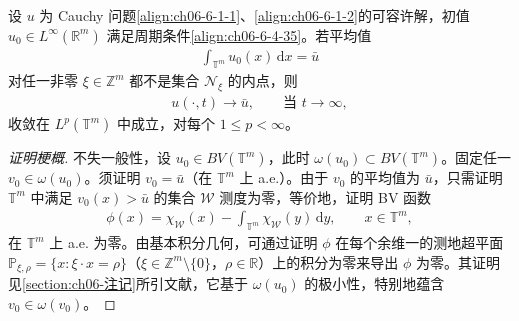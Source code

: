 \documentclass[../../main.tex]{subfiles}
\begin{document}
\begin{theorem}\label{theorem:ch06-6-4-9}
设 $u$ 为 Cauchy 问题\eqref{align:ch06-6-1-1}、\eqref{align:ch06-6-1-2}的可容许解，初值 $u_{0}\in L^{\infty}(\mathbb{R}^{m})$ 满足周期条件\eqref{align:ch06-6-4-35}。若平均值
\begin{align}
\int_{\mathbb{T}^{m}}u_{0}(x)\,\mathrm{d}x=\bar{u}
\label{align:ch06-6-4-39}
\end{align}
对任一非零 $\xi\in\mathbb{Z}^{m}$ 都不是集合 $\mathscr{N}_{\xi}$ 的内点，则
\begin{align}
u(\cdot,t)\to\bar{u},\qquad\text{当 }t\to\infty,
\label{align:ch06-6-4-40}
\end{align}
收敛在 $L^{p}(\mathbb{T}^{m})$ 中成立，对每个 $1\leqslant p<\infty$。
\end{theorem}

\begin{proof}[证明梗概]
不失一般性，设 $u_{0}\in BV(\mathbb{T}^{m})$，此时 $\omega(u_{0})\subset BV(\mathbb{T}^{m})$。固定任一 $v_{0}\in\omega(u_{0})$。须证明 $v_{0}=\bar{u}$（在 $\mathbb{T}^{m}$ 上 a.e.）。由于 $v_{0}$ 的平均值为 $\bar{u}$，只需证明 $\mathbb{T}^{m}$ 中满足 $v_{0}(x)>\bar{u}$ 的集合 $\mathscr{W}$ 测度为零，等价地，证明 BV 函数
\begin{align}
\phi(x)=\chi_{\mathscr{W}}(x)-\int_{\mathbb{T}^{m}}\chi_{\mathscr{W}}(y)\,\mathrm{d}y,\qquad x\in\mathbb{T}^{m},
\label{align:ch06-6-4-41}
\end{align}
在 $\mathbb{T}^{m}$ 上 a.e. 为零。由基本积分几何，可通过证明 $\phi$ 在每个余维一的测地超平面 $\mathbb{P}_{\xi,\rho}=\{x:\xi\cdot x=\rho\}$（$\xi\in\mathbb{Z}^{m}\setminus\{0\}$，$\rho\in\mathbb{R}$）上的积分为零来导出 $\phi$ 为零。其证明见\cref{section:ch06-注记}所引文献，它基于 $\omega(u_{0})$ 的极小性，特别地蕴含 $v_{0}\in\omega(v_{0})$。

\end{proof}
\end{document}
